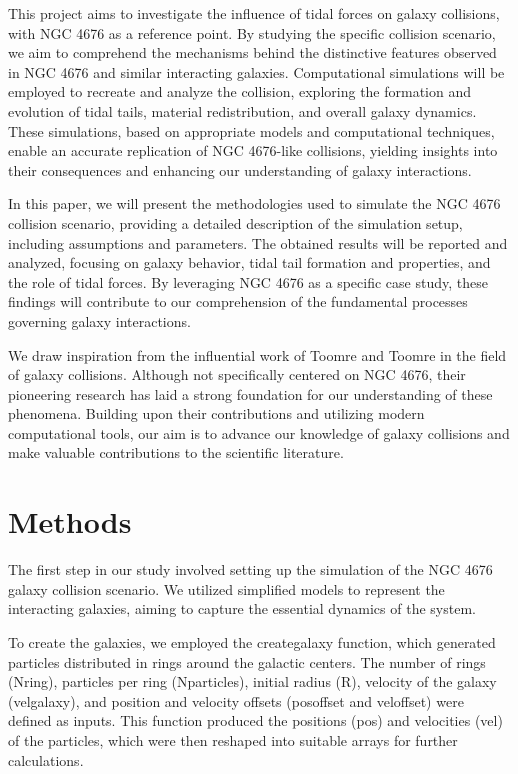\documentclass[reprint, amsmath, amssymb, aps]{revtex4-2}
\begin{document}
This project aims to investigate the influence of tidal forces on galaxy collisions, with NGC 4676 as a reference point. By studying the specific collision scenario, we aim to comprehend the mechanisms behind the distinctive features observed in NGC 4676 and similar interacting galaxies. Computational simulations will be employed to recreate and analyze the collision, exploring the formation and evolution of tidal tails, material redistribution, and overall galaxy dynamics. These simulations, based on appropriate models and computational techniques, enable an accurate replication of NGC 4676-like collisions, yielding insights into their consequences and enhancing our understanding of galaxy interactions.

In this paper, we will present the methodologies used to simulate the NGC 4676 collision scenario, providing a detailed description of the simulation setup, including assumptions and parameters. The obtained results will be reported and analyzed, focusing on galaxy behavior, tidal tail formation and properties, and the role of tidal forces. By leveraging NGC 4676 as a specific case study, these findings will contribute to our comprehension of the fundamental processes governing galaxy interactions.

We draw inspiration from the influential work of Toomre and Toomre \cite{to03000u} in the field of galaxy collisions. Although not specifically centered on NGC 4676, their pioneering research has laid a strong foundation for our understanding of these phenomena. Building upon their contributions and utilizing modern computational tools, our aim is to advance our knowledge of galaxy collisions and make valuable contributions to the scientific literature.

\section{Methods}
\label{sec:methods}

The first step in our study involved setting up the simulation of the NGC 4676 galaxy collision scenario. We utilized simplified models to represent the interacting galaxies, aiming to capture the essential dynamics of the system.

To create the galaxies, we employed the create\textunderscore galaxy function, which generated particles distributed in rings around the galactic centers. The number of rings (N\textunderscore ring), particles per ring (N\textunderscore particles), initial radius (R), velocity of the galaxy (vel\textunderscore galaxy), and position and velocity offsets (pos\textunderscore offset and vel\textunderscore offset) were defined as inputs. This function produced the positions (pos) and velocities (vel) of the particles, which were then reshaped into suitable arrays for further calculations.
\end{document}
